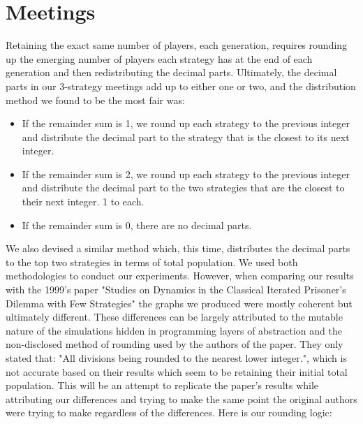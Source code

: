 
\section{Meetings}
Retaining the exact same number of players, each generation, requires rounding up the emerging number of players each strategy has at the end of each generation and then redistributing the decimal parts. Ultimately, the decimal parts in our 3-strategy meetings add up to either one or two, and the distribution method we found to be the most fair was:
\begin{itemize}
    \item If the remainder sum is 1, we round up each strategy to the previous integer and distribute the decimal part to the strategy that is the closest to its next integer.
    \item If the remainder sum is 2, we round up each strategy to the previous integer and distribute the decimal part to the two strategies that are the closest to their next integer. 1 to each.
    \item If the remainder sum is 0, there are no decimal parts.
\end{itemize}
We also devised a similar method which, this time, distributes the decimal parts to the top two strategies in terms of total population. We used both methodologies to conduct our experiments. However, when comparing our results with the 1999's paper "Studies on Dynamics in the Classical Iterated Prisoner's Dilemma with Few Strategies" the graphs we produced were mostly coherent but ultimately different. These differences can be largely attributed to the mutable nature of the simulations hidden in programming layers of abstraction and the non-disclosed method of rounding used by the authors of the paper. They only stated that: "All divisions being rounded to the nearest lower integer.", which is not accurate based on their results which seem to be retaining their initial total population. This will be an attempt to replicate the paper's results while attributing our differences and trying to make the same point the original authors were trying to make regardless of the differences. Here is our rounding logic: 
